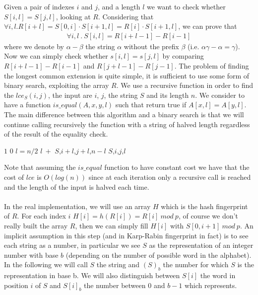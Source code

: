 \documentclass[a4paper]{article}
\begin{document}
Given a pair of indexes $i$ and $j$, and a length $l$ we want to check whether $S[i,l] = S[j,l]$, looking at $R$.
Considering that $\forall i, l . R[i+l] = S[0,i] \cdot S[i+1,l] = R[i] \cdot S[i+1,l]$, we can prove that
\begin{align*}
\forall i, l\ .\ S[i, l] = R[i + l - 1] - R[i-1]
\end{align*}
where we denote by $\alpha - \beta$ the string $\alpha$ without the prefix $\beta$ (i.e. $\alpha\gamma - \alpha = \gamma$). Now we can simply check whether $s[i,l] = s[j,l]$ by comparing $R[i + l - 1] - R[i-1]$ and $R[j + l - 1] - R[j-1]$.
The problem of finding the longest common extension is quite simple, it is sufficient to use some form of binary search, exploiting the array $R$.
We use a recursive function in order to find the $lce_S(i, j)$, the input are $i$, $j$, the string $S$ and its length $n$.
We consider to have a function $is\_equal(A, x, y, l)$ such that return true if $A[x, l] = A[y, l]$.
The main difference between this algorithm and a binary search is that we will continue calling recursively the function with a string of halved length regardless of the result of the equality check.
\begin{algorithmic}
		\State \Return $1$ 
	\Else 
		\State \Return $0$
	\EndIf
\EndIf
\State $l = n/2$
	\State \Return $l\ + $  {$S$,$i + l$,$j + l$,$n - l$}
\Else
	\State \Return {} {$S$,$i$,$j$,$l$}
\EndIf
\EndFunction
\end{algorithmic}
Note that assuming the $is\_equal$ function to have constant cost we have that the cost of $lce$ is $O(log(n))$ since at each iteration only a recursive call is reached and the length of the input is halved each time.
\\
\\
In the real implementation, we will use an array $H$ which is the hash fingerprint of $R$.
For each index $i$ $H[i] = h(R[i]) = R[i]\ mod\ p$, of course we don't really built the array $R$, then we can simply fill $H[i]$ with $S[0,i+1]\ mod\ p$.
An implicit assumption in this step (and in Karp-Rabin fingerprint in fact) is to see each string as a number, in particular we see $S$ as the representation of an integer number with base $b$ (depending on the number of possible word in the alphabet).
In the following we will call $S$ the string and $(S)_b$ the number for which $S$ is the representation in base b.
We will also distinguish between $S[i]$ the word in position $i$ of $S$ and $S[i]_b$ the number between $0$ and $b-1$ which represents.
\end{document}
